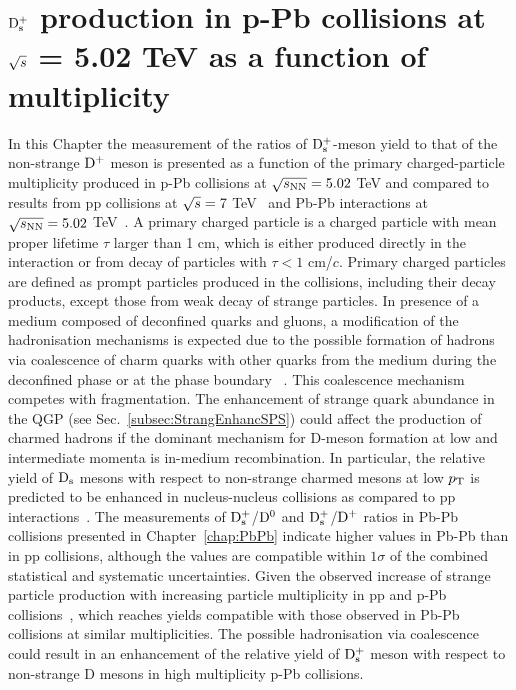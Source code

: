 \chapter{${\rm D_s^+}$ production in p-Pb collisions at $\sqrt{s}$ = 5.02 TeV as a function of multiplicity}
\label{chap:chap6}

In this Chapter the measurement of the ratios of ${\rm D_s^+}$-meson yield to that of the 
non-strange ${\rm D^+}$ meson is presented as a function of the primary
charged-particle multiplicity produced in p-Pb collisions at $\sqrt{s_{\rm NN}}=5.02$ TeV and compared to results from 
pp collisions at $\sqrt{s}=7$ TeV~\cite{Acharya:2017jgo} and Pb-Pb interactions at $\sqrt{s_{\rm NN}}=5.02$ TeV~\cite{ALICE-PUBLIC-2017-003}. 
A primary charged particle is a charged particle with mean proper lifetime $\tau$ larger
than 1 cm, which is either produced directly in the interaction or from decay of particles
with $\tau < 1$ cm/$c$.
Primary charged particles are defined as prompt
particles produced in the collisions, including their decay products,
except those from weak decay of strange particles.
In presence of a medium 
composed of deconfined quarks and gluons, a modification of the hadronisation 
mechanisms is expected due to the possible formation of hadrons via
coalescence of charm quarks with other quarks from the 
medium during the deconfined phase or at the phase boundary
~\cite{Greco:2003mm,Greco:2003vf, Andronic:2007zu, He:2012df}. This coalescence mechanism competes with
fragmentation. The enhancement of strange quark abundance in the QGP 
(see Sec.~\ref{subsec:StrangEnhancSPS}) could affect the production of charmed hadrons if 
the dominant mechanism for D-meson formation at low and 
intermediate momenta is in-medium recombination. 
In particular, the relative yield of ${\rm D_s}$ 
mesons with respect to non-strange charmed mesons at low $p_{\rm T}$ is 
predicted to be enhanced in nucleus-nucleus collisions as compared to pp 
interactions~\cite{Andronic2003,RafelskiKuznetsova,HeFriesRapp}.
The measurements of ${\rm D_s^+}$/${\rm D^0}$ and ${\rm D_s^+}$/${\rm D^+}$ ratios in Pb-Pb collisions presented in 
Chapter~\ref{chap:PbPb} indicate higher values in Pb-Pb than in pp collisions, although
the values are compatible within $1\sigma$ of the combined statistical and systematic uncertainties.
Given the observed increase of strange particle production with increasing particle multiplicity
in pp and p-Pb collisions~\cite{Abelev:2013haa,Adam:2015vsf,ALICE:2017jyt}, which reaches
yields compatible with those observed in Pb-Pb collisions at similar multiplicities. The possible 
hadronisation via coalescence could result in an enhancement 
of the relative yield of ${\rm D_s^+}$ meson with respect to non-strange
D mesons in high multiplicity p-Pb collisions.


